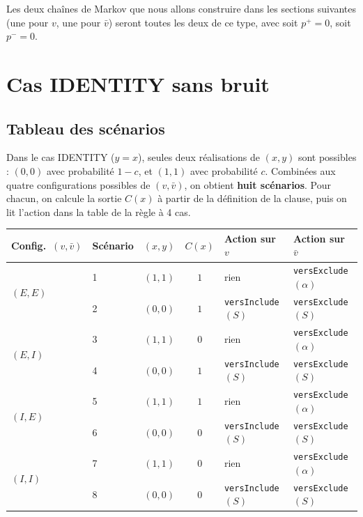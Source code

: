 \documentclass[12pt,a4paper]{article}
\theoremstyle{remark}
\newcommand{\vbar}{\bar{v}}
\begin{document}
Les deux chaînes de Markov que nous allons construire dans les sections suivantes
(une pour $v$, une pour $\vbar$) seront toutes les deux de ce type,
avec soit $p^+ = 0$, soit $p^- = 0$.

\section{Cas IDENTITY sans bruit}

\subsection{Tableau des scénarios}

Dans le cas IDENTITY ($y = x$), seules deux réalisations de $(x,y)$ sont possibles :
$(0,0)$ avec probabilité $1-c$, et $(1,1)$ avec probabilité $c$.
Combinées aux quatre configurations possibles de $(v,\vbar)$, on obtient
\textbf{huit scénarios}.  Pour chacun, on calcule la sortie $C(x)$ à partir de la
définition de la clause, puis on lit l'action dans la table de la règle à 4 cas.

\begin{center}
\renewcommand{\arraystretch}{1.35}
\begin{tabular}{llccll}
\toprule
Config.\ $(v,\vbar)$ & Scénario & $(x,y)$ & $C(x)$ & Action sur $v$ & Action sur $\vbar$ \\
\midrule
\multirow{2}{*}{$(E,E)$}
  & 1 & $(1,1)$ & $1$ & rien                    & \texttt{versExclude}$(\alpha)$ \\
  & 2 & $(0,0)$ & $1$ & \texttt{versInclude}$(S)$ & \texttt{versExclude}$(S)$ \\
\midrule
\multirow{2}{*}{$(E,I)$}
  & 3 & $(1,1)$ & $0$ & rien                    & \texttt{versExclude}$(\alpha)$ \\
  & 4 & $(0,0)$ & $1$ & \texttt{versInclude}$(S)$ & \texttt{versExclude}$(S)$ \\
\midrule
\multirow{2}{*}{$(I,E)$}
  & 5 & $(1,1)$ & $1$ & rien                    & \texttt{versExclude}$(\alpha)$ \\
  & 6 & $(0,0)$ & $0$ & \texttt{versInclude}$(S)$ & \texttt{versExclude}$(S)$ \\
\midrule
\multirow{2}{*}{$(I,I)$}
  & 7 & $(1,1)$ & $0$ & rien                    & \texttt{versExclude}$(\alpha)$ \\
  & 8 & $(0,0)$ & $0$ & \texttt{versInclude}$(S)$ & \texttt{versExclude}$(S)$ \\
\bottomrule
\end{tabular}
\end{center}
\end{document}
